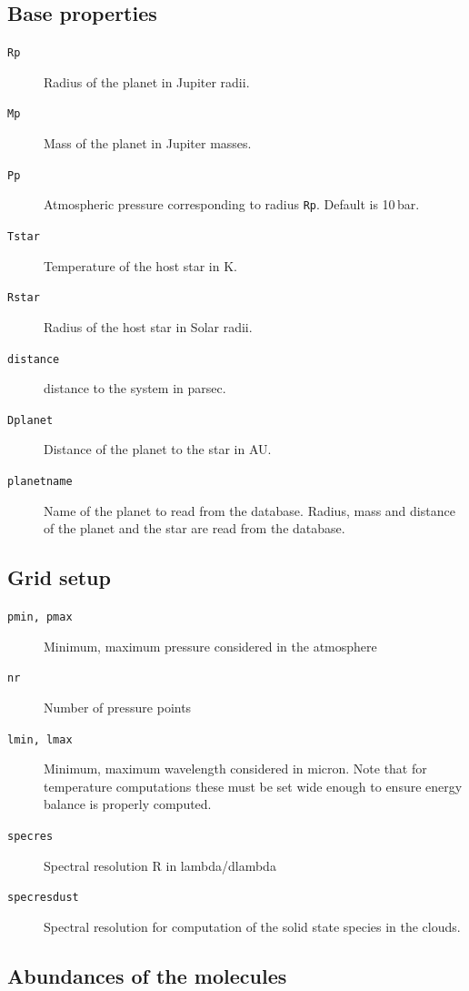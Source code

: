 \documentclass[12pt]{article}
\begin{document}
\subsection{Base properties}

\begin{description}
\item[\texttt{Rp}]
Radius of the planet in Jupiter radii.
\item[\texttt{Mp}]
Mass of the planet in Jupiter masses.
\item[\texttt{Pp}]
Atmospheric pressure corresponding to radius \texttt{Rp}. Default is 10\,bar.
\item[\texttt{Tstar}]
Temperature of the host star in K.
\item[\texttt{Rstar}]
Radius of the host star in Solar radii.
\item[\texttt{distance}]
distance to the system in parsec.
\item[\texttt{Dplanet}]
Distance of the planet to the star in AU.
\item[\texttt{planetname}]
Name of the planet to read from the database. Radius, mass and distance of the planet and the star are read from the database.
\end{description}

\subsection{Grid setup}

\begin{description}
\item[\texttt{pmin, pmax}]
Minimum, maximum pressure considered in the atmosphere
\item[\texttt{nr}]
Number of pressure points
\item[\texttt{lmin, lmax}]
Minimum, maximum wavelength considered in micron. Note that for temperature computations these must be set wide enough to ensure energy balance is properly computed.
\item[\texttt{specres}]
Spectral resolution R in lambda/dlambda
\item[\texttt{specresdust}]
Spectral resolution for computation of the solid state species in the clouds.
\end{description}

\subsection{Abundances of the molecules}
\end{document}

